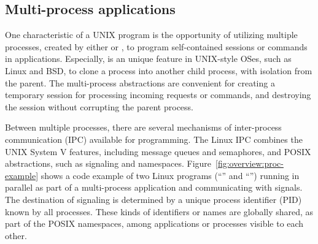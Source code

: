 \subsection{Multi-process applications}
\label{sec:intro:multiproc}


One characteristic of a UNIX program is the opportunity of utilizing multiple processes, created by either  or ,
to program self-contained sessions or commands in applications.
Especially,  is an unique feature in UNIX-style OSes, such as Linux and BSD,
to clone a process into another child process, with isolation from the parent.
The multi-process abstractions are convenient for creating a temporary session for processing incoming requests or commands, and destroying the session without corrupting the parent process.

Between multiple processes, there are several mechanisms of inter-process communication (IPC)  available for programming.
The Linux IPC combines the UNIX System V features, including message queues and semaphores,
and POSIX abstractions, such as signaling and namespaces.
Figure~\ref{fig:overview:proc-example} shows a code example of
two Linux programs (``'' and ``'')
running in parallel as part of a multi-process application and communicating with signals.
The destination of signaling is determined by a unique process identifier (PID)
known by all processes.
These kinds of identifiers or names are globally shared, as part of the POSIX namespaces,
among applications or processes visible to each other.

 

